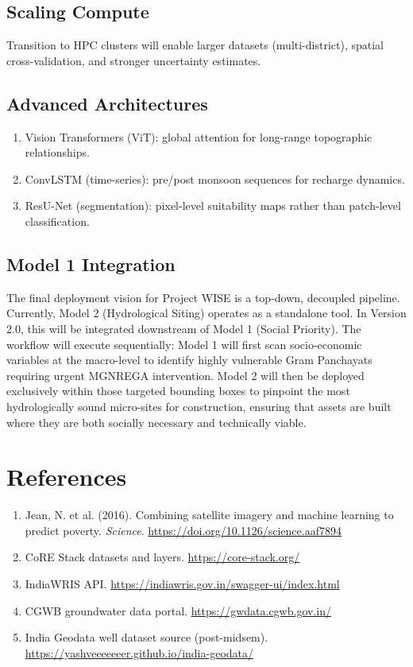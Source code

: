 \documentclass[12pt,a4paper]{report}
\begin{document}
\section{Scaling Compute}
Transition to HPC clusters will enable larger datasets (multi-district), spatial cross-validation, and stronger uncertainty estimates.

\section{Advanced Architectures}
\begin{enumerate}
  \item Vision Transformers (ViT): global attention for long-range topographic relationships.
  \item ConvLSTM (time-series): pre/post monsoon sequences for recharge dynamics.
  \item ResU-Net (segmentation): pixel-level suitability maps rather than patch-level classification.
\end{enumerate}

\section{Model 1 Integration}
The final deployment vision for Project WISE is a top-down, decoupled pipeline. Currently, Model 2 (Hydrological Siting) operates as a standalone tool. In Version 2.0, this will be integrated downstream of Model 1 (Social Priority). The workflow will execute sequentially: Model 1 will first scan socio-economic variables at the macro-level to identify highly vulnerable Gram Panchayats requiring urgent MGNREGA intervention. Model 2 will then be deployed exclusively within those targeted bounding boxes to pinpoint the most hydrologically sound micro-sites for construction, ensuring that assets are built where they are both socially necessary and technically viable.

\chapter*{References}
\begin{enumerate}
  \item Jean, N. et al. (2016). Combining satellite imagery and machine learning to predict poverty. \textit{Science}. \url{https://doi.org/10.1126/science.aaf7894}
  \item CoRE Stack datasets and layers. \url{https://core-stack.org/}
  \item IndiaWRIS API. \url{https://indiawris.gov.in/swagger-ui/index.html}
  \item CGWB groundwater data portal. \url{https://gwdata.cgwb.gov.in/}
  \item India Geodata well dataset source (post-midsem). \url{https://yashveeeeeeer.github.io/india-geodata/}
\end{enumerate}
\end{document}
